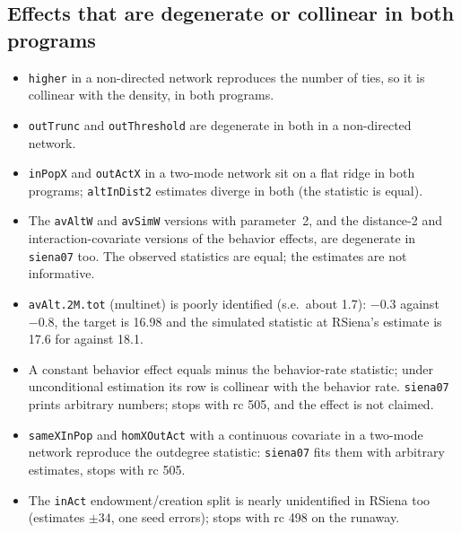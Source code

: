 \subsection{Effects that are degenerate or collinear in both programs}
\begin{itemize}
\item \texttt{higher} in a non-directed network reproduces the number of ties, so it is collinear with the density, in both programs.
\item \texttt{outTrunc} and \texttt{outThreshold} are degenerate in both in a non-directed network.
\item \texttt{inPopX} and \texttt{outActX} in a two-mode network sit on a flat ridge in both programs; \texttt{altInDist2} estimates diverge in both (the statistic is equal).
\item The \texttt{avAltW} and \texttt{avSimW} versions with parameter~2, and the distance-2 and interaction-covariate versions of the behavior effects, are degenerate in \texttt{siena07} too. The observed statistics are equal; the estimates are not informative.
\item \texttt{avAlt.2M.tot} (multinet) is poorly identified (s.e.\ about 1.7): $-0.3$ against $-0.8$, the target is 16.98 and the simulated statistic at RSiena's estimate is 17.6 for \nwsaom{} against 18.1.
\item A constant behavior effect equals minus the behavior-rate statistic; under unconditional estimation its row is collinear with the behavior rate. \texttt{siena07} prints arbitrary numbers; \nwsaom{} stops with rc 505, and the effect is not claimed.
\item \texttt{sameXInPop} and \texttt{homXOutAct} with a continuous covariate in a two-mode network reproduce the outdegree statistic: \texttt{siena07} fits them with arbitrary estimates, \nwsaom{} stops with rc 505.
\item The \texttt{inAct} endowment/creation split is nearly unidentified in RSiena too (estimates $\pm34$, one seed errors); \nwsaom{} stops with rc 498 on the runaway.
\end{itemize}

